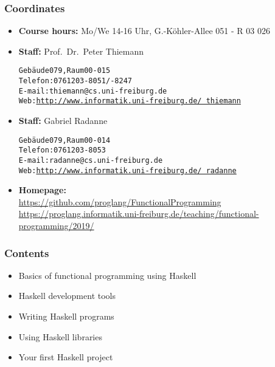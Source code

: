 \documentclass{beamer}
\begin{document}
\begin{frame}
  \titlepage
\end{frame}

\begin{frame}[fragile]
  \frametitle{Coordinates}
  \begin{itemize}
  \item \textbf{Course hours:}  Mo/We 14-16 Uhr, G.-Köhler-Allee 051 - R 03 026
  \item \textbf{Staff:} Prof.\ Dr.\ Peter Thiemann\\
\begin{alltt}
Gebäude 079, Raum 00-015
Telefon: 0761 203 -8051/-8247
E-mail: thiemann@cs.uni-freiburg.de
Web: \href{http://www.informatik.uni-freiburg.de/~thiemann}{http://www.informatik.uni-freiburg.de/~thiemann}
\end{alltt}
\item  \textbf{Staff:} Gabriel Radanne\\
\begin{alltt}
Gebäude 079, Raum 00-014
Telefon: 0761 203 -8053
E-mail: radanne@cs.uni-freiburg.de
Web: \href{http://www.informatik.uni-freiburg.de/~radanne}{http://www.informatik.uni-freiburg.de/~radanne}
\end{alltt}
  \item\textbf{Homepage:}\\ \footnotesize
    \href{https://github.com/proglang/FunctionalProgramming}{
      https://github.com/proglang/FunctionalProgramming}
    \\
    \href{https://proglang.informatik.uni-freiburg.de/teaching/functional-programming/2019/}{
      https://proglang.informatik.uni-freiburg.de/teaching/functional-programming/2019/}
  \end{itemize}
\end{frame}


\begin{frame}
  \frametitle{Contents}
  \begin{itemize}
  \item Basics of functional programming using Haskell
  \item Haskell development tools
  \item Writing Haskell programs
  \item Using Haskell libraries
  \item Your first Haskell project
  \end{itemize}
\end{frame}
\end{document}
